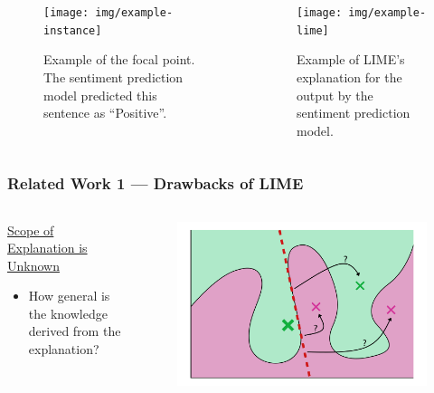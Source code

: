 \documentclass[aspectratio=169]{slide-en}
\begin{document}
\begin{frame}{}
  \begin{columns}[]
    \begin{column}{0.35\textwidth}
      \vspace{4.2em}
      \begin{figure}
        \texttt{[image: img/example-instance]}
        \vspace{0.8em}
        \caption{%
          Example of the focal point.
          The sentiment prediction model predicted this sentence as ``Positive''.
        }
      \end{figure}
    \end{column}
    \begin{column}{0.4\textwidth}
      \begin{figure}
        \texttt{[image: img/example-lime]}
        \caption{%
          Example of LIME's explanation for the output
          by the sentiment prediction model.
        }
      \end{figure}
    \end{column}
  \end{columns}
\end{frame}

\begin{frame}
  \frametitle{Related Work 1 — Drawbacks of LIME}
  \begin{columns}[]
    \begin{column}{0.4\textwidth}
      \underline{Scope of Explanation is Unknown}

      \bigskip
      \begin{itemize}
        \item How general is the knowledge derived from the explanation?
      \end{itemize}
    \end{column}
    \begin{column}{0.45\textwidth}
      \begin{figure}
        \includegraphics[width=\textwidth]{lime_drawback}
      \end{figure}
    \end{column}
  \end{columns}
\end{frame}
\end{document}
